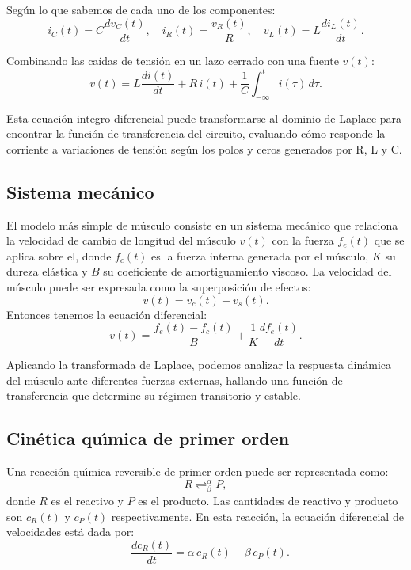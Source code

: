 \documentclass[11pt,a4paper,openany]{book}
\begin{document}
Seg\'{u}n lo que sabemos de cada uno de los componentes: 
\begin{equation}
	i_{C}(t) = C\frac{dv_{C}(t)}{dt}, \quad i_{R}(t) = \frac{v_{R}(t)}{R}, \quad v_{L}(t) = L\frac{di_{L}(t)}{dt}.
\end{equation}

Combinando las caídas de tensión en un lazo cerrado con una fuente $v(t)$:
\begin{equation}
	v(t) = L\frac{di(t)}{dt} + R \, i(t) + \frac{1}{C}\int_{-\infty }^{t} i(\tau) \, d\tau.
	\label{sisUno}
\end{equation}

Esta ecuación integro-diferencial puede transformarse al dominio de Laplace para encontrar la función de transferencia del circuito, evaluando cómo responde la corriente a variaciones de tensión según los polos y ceros generados por R, L y C.

\subsection{Sistema mec\'{a}nico}

El modelo m\'{a}s simple de m\'{u}sculo consiste en un sistema mec\'{a}nico que relaciona la velocidad de cambio de longitud del m\'{u}sculo $v(t)$ con la fuerza $f_{e}(t)$ que se aplica sobre el, donde $f_{c}(t)$ es la fuerza interna generada por el m\'{u}sculo, $K$ su dureza elástica y $B$ su coeficiente de amortiguamiento viscoso. La velocidad del m\'{u}sculo puede ser expresada como la superposición de efectos:
\begin{equation}
	v(t) = v_{c}(t) + v_{s}(t).
\end{equation}
Entonces tenemos la ecuaci\'{o}n diferencial:
\begin{equation}
	v(t) = \frac{f_{e}(t) - f_{c}(t)}{B} + \frac{1}{K}\frac{df_{e}(t)}{dt}.
	\label{sisDos}
\end{equation}

Aplicando la transformada de Laplace, podemos analizar la respuesta dinámica del músculo ante diferentes fuerzas externas, hallando una función de transferencia que determine su régimen transitorio y estable.

\subsection{Cin\'{e}tica qu\'{\i}mica de primer orden}

Una reacci\'{o}n qu\'{\i}mica reversible de primer orden puede ser representada como:
\begin{equation}
	R \rightleftharpoons_{\beta}^{\alpha} P,
\end{equation}
donde $R$ es el reactivo y $P$ es el producto. Las cantidades de reactivo y producto son $c_{R}(t)$ y $c_{P}(t)$ respectivamente. En esta reacci\'{o}n, la ecuaci\'{o}n diferencial de velocidades est\'{a} dada por:
\begin{equation}
	-\frac{dc_{R}(t)}{dt} = \alpha \, c_{R}(t) - \beta \, c_{P}(t).
\end{equation}
\end{document}
